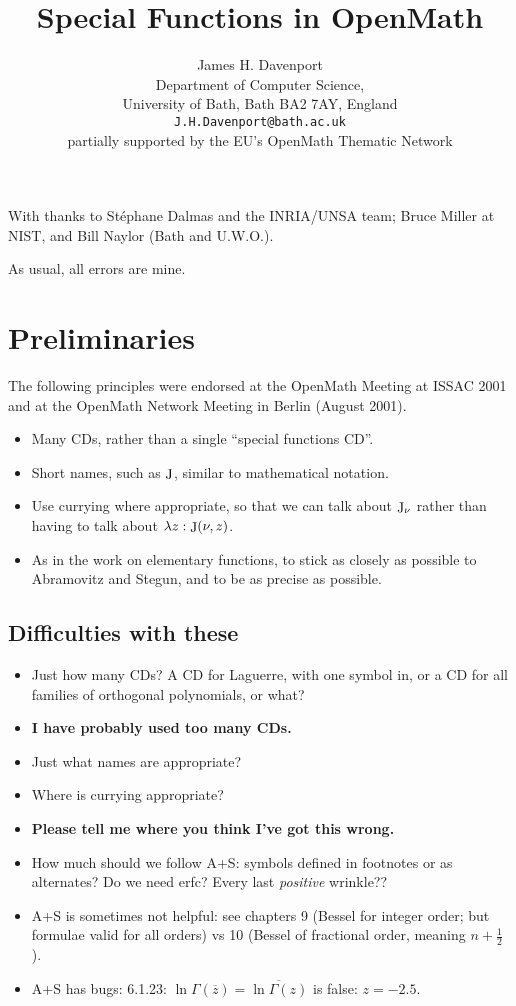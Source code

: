 \documentclass[11pt,a4paper]{artikel3}
\begin{document}
\title{Special Functions in OpenMath}
\author{James H. Davenport\\
Department of Computer Science,\\
University of Bath, Bath BA2 7AY, England\\
{\tt   J.H.Davenport@bath.ac.uk}\\
partially supported by the EU's OpenMath Thematic Network}
\date{}
\maketitle
\par\noindent
With thanks to St\'ephane Dalmas and the INRIA/UNSA team; Bruce Miller at
NIST, and Bill Naylor (Bath and U.W.O.).
\par\noindent
As usual, all errors are mine.
\section{Preliminaries}
The following principles were endorsed at the OpenMath Meeting at ISSAC
2001 and at the OpenMath Network Meeting in Berlin (August 2001).
\begin{itemize}
\item Many CDs, rather than a single ``special functions CD''.
\item Short names, such as $\mathop{\rm J}\nolimits$, similar to mathematical notation.
\item Use currying where appropriate, so that we can talk about $\mathop{\rm J}\nolimits_\nu$
rather than having to talk about $\lambda z:\mathop{\rm J}\nolimits(\nu,z)$.
\item As in the work on elementary functions, to stick as closely as
possible to Abramovitz and Stegun, and to be as precise as possible.
\end{itemize}
\subsection{Difficulties with these}
\begin{itemize}
\item Just how many CDs? A CD for Laguerre, with one symbol in, or a CD for
all families of orthogonal polynomials, or what?
\item[]{\bf I have probably used too many CDs.}
\item Just what names are appropriate?
\item Where is currying appropriate?
\item[]{\bf Please tell me where you think I've got this wrong.}
\item How much should we follow A+S: symbols defined in footnotes or as
alternates? Do we need erfc? Every last {\it positive\/} wrinkle??
\item A+S is sometimes not helpful: see chapters 9 (Bessel for integer
order; but formulae valid for all orders) vs 10 (Bessel of fractional
order, meaning $n+\frac12$).
\item A+S has bugs: 6.1.23: $\ln\Gamma(\overline z)=\overline{\ln\Gamma(z)}$
is false: $z=-2.5$.
\end{itemize}
\end{document}
